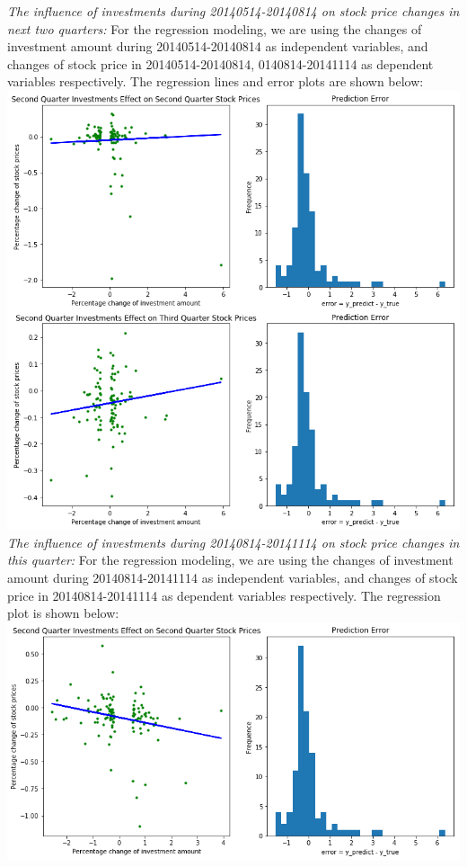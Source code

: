 \documentclass{article}
\begin{document}
\begin{multicols}{2}
\textit{The influence of investments during 20140514-20140814 on stock price changes in next two quarters:}
For the regression modeling, we are using the changes of investment amount during 20140514-20140814 as independent variables, and changes of stock price in 20140514-20140814, 0140814-20141114 as dependent variables respectively. The regression lines and error plots are shown below:
\includegraphics[scale=.32]{logregression2.png}\\[1cm] 

\textit{The influence of investments during 20140814-20141114 on stock price changes in this quarter:}
For the regression modeling, we are using the changes of investment amount during 20140814-20141114 as independent variables, and changes of stock price in 20140814-20141114 as dependent variables respectively. The regression plot is shown below:
\includegraphics[scale=.32]{logregression3.png}\\[1cm]\\


\end{multicols}
\end{document}
